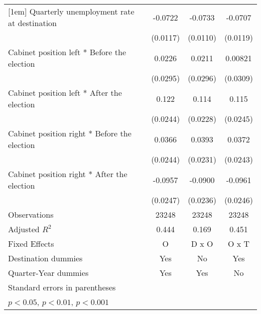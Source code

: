 \begin{table}[htbp]
\begin{tabular}{l*{3}{c}}
[1em]
Quarterly unemployment rate at destination&     -0.0722\sym{***}&     -0.0733\sym{***}&     -0.0707\sym{***}\\
                    &    (0.0117)         &    (0.0110)         &    (0.0119)         \\
[1em]
Cabinet position left * Before the election&      0.0226         &      0.0211         &     0.00821         \\
                    &    (0.0295)         &    (0.0296)         &    (0.0309)         \\
[1em]
Cabinet position left * After the election&       0.122\sym{***}&       0.114\sym{***}&       0.115\sym{***}\\
                    &    (0.0244)         &    (0.0228)         &    (0.0245)         \\
[1em]
Cabinet position right * Before the election&      0.0366         &      0.0393         &      0.0372         \\
                    &    (0.0244)         &    (0.0231)         &    (0.0243)         \\
[1em]
Cabinet position right * After the election&     -0.0957\sym{***}&     -0.0900\sym{***}&     -0.0961\sym{***}\\
                    &    (0.0247)         &    (0.0236)         &    (0.0246)         \\
\hline
Observations        &       23248         &       23248         &       23248         \\
Adjusted \(R^{2}\)  &       0.444         &       0.169         &       0.451         \\
Fixed Effects       &           O         &       D x O         &       O x T         \\
Destination dummies &         Yes         &          No         &         Yes         \\
Quarter-Year dummies&         Yes         &         Yes         &          No         \\
\hline\hline
\multicolumn{4}{l}{\footnotesize Standard errors in parentheses}\\
\multicolumn{4}{l}{\footnotesize \sym{*} \(p<0.05\), \sym{**} \(p<0.01\), \sym{***} \(p<0.001\)}\\
\end{tabular}
\end{table}
